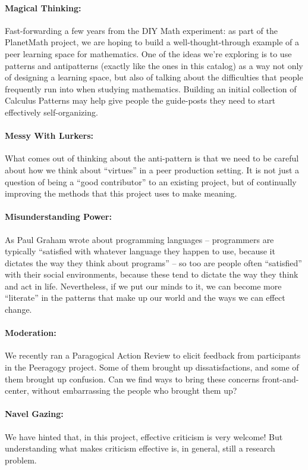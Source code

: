 \paragraph{Magical Thinking:}  Fast-forwarding a few years from the DIY Math experiment: as part of the
PlanetMath project, we are hoping to build a well-thought-through
example of a peer learning space for mathematics. One of the ideas we’re
exploring is to use patterns and antipatterns (exactly like the ones in
this catalog) as a way not only of designing a learning space, but also
of talking about the difficulties that people frequently run into when
studying mathematics. Building an initial collection of Calculus
Patterns may help give people the guide-posts they need to start
effectively self-organizing.

\paragraph{Messy With Lurkers:} What comes out of thinking about the anti-pattern is that we need to be
careful about how we think about “virtues” in a peer production setting.
It is not just a question of being a “good contributor” to an existing
project, but of continually improving the methods that this project uses
to make meaning.

\paragraph{Misunderstanding Power:} As Paul Graham wrote about programming languages – programmers are
typically “satisfied with whatever language they happen to use, because
it dictates the way they think about programs” – so too are people often
“satisfied” with their social environments, because these tend to
dictate the way they think and act in life. Nevertheless, if we put our
minds to it, we can become more “literate” in the patterns that make up
our world and the ways we can effect change.

\paragraph{Moderation:} We recently ran a Paragogical Action Review to elicit feedback from
participants in the Peeragogy project. Some of them brought up
dissatisfactions, and some of them brought up confusion. Can we find
ways to bring these concerns front-and-center, without embarrassing the
people who brought them up?

\paragraph{Navel Gazing:} We have hinted that, in this project, effective criticism is very
welcome! But understanding what makes criticism effective is, in
general, still a research problem.


